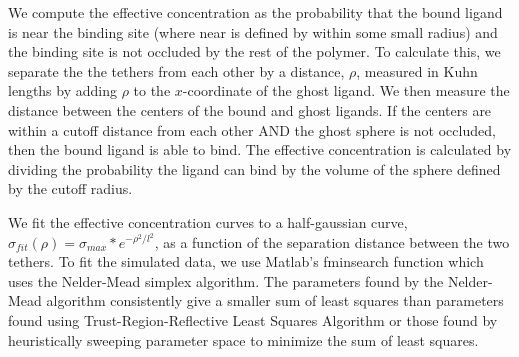 \documentclass[../../AdvancementSummary.tex]{subfiles}
\begin{document}
We compute the effective concentration as the probability that the bound ligand is near the binding site (where near is defined by within some small radius) and the binding site is not occluded by the rest of the polymer. To calculate this, we separate the the tethers from each other by a distance, $\rho$, measured in Kuhn lengths by adding $\rho$ to the $x$-coordinate of the ghost ligand. We then measure the distance between the centers of the bound and ghost ligands. If the centers are within a cutoff distance from each other AND the ghost sphere is not occluded, then the bound ligand is able to bind. The effective concentration is calculated by dividing the probability the ligand can bind by the volume of the sphere defined by the cutoff radius.


We fit the effective concentration curves to a half-gaussian curve, $\sigma_{fit}(\rho) = \sigma_{max}*e^{-\rho^2/l^2}$, as a function of the separation distance between the two tethers. To fit the simulated data, we use Matlab's fminsearch function which uses the Nelder-Mead simplex algorithm. The parameters found by the Nelder-Mead algorithm consistently give a smaller sum of least squares than parameters found using Trust-Region-Reflective Least Squares Algorithm or those found by heuristically sweeping parameter space to minimize the sum of least squares.
\end{document}
